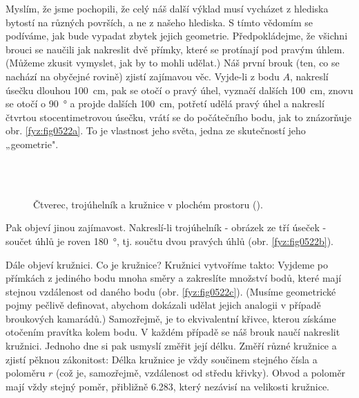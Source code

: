     Myslím, že jsme pochopili, že celý náš další výklad musí vycházet z hlediska bytostí na různých 
    površích, a ne z našeho hlediska. S tímto vědomím se podíváme, jak bude vypadat zbytek jejich 
    geometrie. Předpokládejme, že všichni brouci se naučili jak nakreslit dvě přímky, které se 
    protínají pod pravým úhlem. (Můžeme zkusit vymyslet, jak by to mohli udělat.) Náš první brouk 
    (ten, co se nachází na obyčejné rovině) zjistí zajímavou věc. Vyjde-li z bodu \(A\), nakreslí 
    úsečku dlouhou \SI{100}{\cm}, pak se otočí o pravý úhel, vyznačí dalších \SI{100}{\cm}, znovu 
    se otočí o \SI{90}{\degree} a projde dalších \SI{100}{\cm}, potřetí udělá pravý úhel a nakreslí 
    čtvrtou stocentimetrovou úsečku, vrátí se do počátečního bodu, jak to znázorňuje obr. 
    \ref{fyz:fig0522a}. To je vlastnost jeho světa, jedna ze skutečností jeho „geometrie".
    
    \begin{figure}[ht!] %
      \centering  
          \\
          \\
      \caption{Čtverec, trojúhelník a kružnice v plochém prostoru (\cite[s.~777]{Feynman02}).}
      \label{fyz:fig0522}
    \end{figure}     
    
    Pak objeví jinou zajímavost. Nakreslí-li trojúhelník - obrázek ze tří úseček - součet úhlů je 
    roven \SI{180}{\degree}, tj. součtu dvou pravých úhlů (obr. \ref{fyz:fig0522b}).
    
    Dále objeví kružnici. Co je kružnice? Kružnici vytvoříme takto: Vyjdeme po přímkách z jediného 
    bodu mnoha směry a zakreslíte množství bodů, které mají stejnou vzdálenost od daného bodu (obr. 
    \ref{fyz:fig0522c}). (Musíme geometrické pojmy pečlivě definovat, abychom dokázali udělat jejich 
    analogii v případě broukových kamarádů.) Samozřejmě, je to ekvivalentní křivce, kterou získáme 
    otočením pravítka kolem bodu. V každém případě se náš brouk naučí nakreslit kružnici. Jednoho 
    dne si pak usmyslí změřit její délku. Změří různé kružnice a zjistí pěknou zákonitost: Délka 
    kružnice je vždy součinem stejného čísla a poloměru \(r\) (což je, samozřejmě, vzdálenost od 
    středu křivky). Obvod a poloměr mají vždy stejný poměr, přibližně \num{6.283}, který nezávisí 
    na velikosti kružnice.

